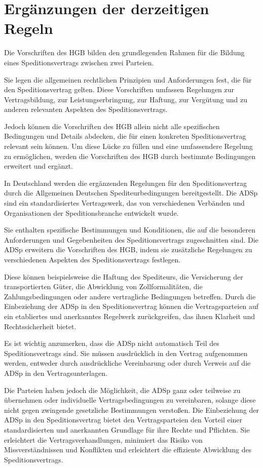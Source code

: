 \section{Ergänzungen der derzeitigen Regeln}
Die Vorschriften des \ac{HGB} bilden den grundlegenden Rahmen für die Bildung eines Speditionsvertrags zwischen zwei Parteien.

Sie legen die allgemeinen rechtlichen Prinzipien und Anforderungen fest, die für den Speditionsvertrag gelten.
Diese Vorschriften umfassen Regelungen zur Vertragsbildung, zur Leistungserbringung, zur Haftung, zur Vergütung und zu anderen relevanten Aspekten des Speditionsvertrags.

Jedoch können die Vorschriften des \ac{HGB} allein nicht alle spezifischen Bedingungen und Details abdecken, die für einen konkreten Speditionsvertrag relevant sein können.
Um diese Lücke zu füllen und eine umfassendere Regelung zu ermöglichen, werden die Vorschriften des \ac{HGB} durch bestimmte Bedingungen erweitert und ergänzt.

In Deutschland werden die ergänzenden Regelungen für den Speditionsvertrag durch die Allgemeinen Deutschen Spediteurbedingungen bereitgestellt.
Die ADSp sind ein standardisiertes Vertragswerk, das von verschiedenen Verbänden und Organisationen der Speditionsbranche entwickelt wurde.

Sie enthalten spezifische Bestimmungen und Konditionen, die auf die besonderen Anforderungen und Gegebenheiten des Speditionsvertrags zugeschnitten sind.
Die ADSp erweitern die Vorschriften des \ac{HGB}, indem sie zusätzliche Regelungen zu verschiedenen Aspekten des Speditionsvertrags festlegen.

Diese können beispielsweise die Haftung des Spediteurs, die Versicherung der transportierten Güter, die Abwicklung von Zollformalitäten, die Zahlungsbedingungen oder andere vertragliche Bedingungen betreffen.
Durch die Einbeziehung der ADSp in den Speditionsvertrag können die Vertragsparteien auf ein etabliertes und anerkanntes Regelwerk zurückgreifen, das ihnen Klarheit und Rechtssicherheit bietet.

Es ist wichtig anzumerken, dass die ADSp nicht automatisch Teil des Speditionsvertrags sind.
Sie müssen ausdrücklich in den Vertrag aufgenommen werden, entweder durch ausdrückliche Vereinbarung oder durch Verweis auf die ADSp in den Vertragsunterlagen.

Die Parteien haben jedoch die Möglichkeit, die ADSp ganz oder teilweise zu übernehmen oder individuelle Vertragsbedingungen zu vereinbaren, solange diese nicht gegen zwingende gesetzliche Bestimmungen verstoßen.
Die Einbeziehung der ADSp in den Speditionsvertrag bietet den Vertragsparteien den Vorteil einer standardisierten und anerkannten Grundlage für ihre Rechte und Pflichten.
Sie erleichtert die Vertragsverhandlungen, minimiert das Risiko von Missverständnissen und Konflikten und erleichtert die effiziente Abwicklung des Speditionsvertrags.

